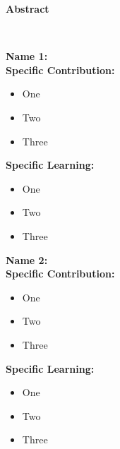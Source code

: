 \documentclass[12pt,a4paper]{report}
\begin{document}
\newpage
\tableofcontents
\newpage
\listoffigures{}
\newpage
\listoftables
\makeatletter
\renewcommand*{\numberline}[1]{\hb@xt@1em{#1\hfil}} 
\makeatother
\newpage
\centerline{\Large\textbf{Abstract}}
\leavevmode\\
\raggedright\textbf{Name 1:}\\ %



\textbf{Specific Contribution:}\\
\vspace{-5mm}
\begin{itemize}
    \item One
    \vspace{-4mm}\item Two
    \vspace{-4mm}\item Three
\end{itemize}
\textbf{Specific Learning:}\\
\vspace{-5mm}
\begin{itemize}
    \item One
    \vspace{-4mm}\item Two
    \vspace{-4mm}\item Three
\end{itemize}
\textbf{Name 2:}\\ %
\justifying
\textbf{Specific Contribution:}\\
\vspace{-5mm}
\begin{itemize}
    \item One
    \vspace{-4mm}\item Two
    \vspace{-4mm}\item Three
\end{itemize}
\textbf{Specific Learning:}\\
\vspace{-5mm}
\begin{itemize}
    \item One
    \vspace{-4mm}\item Two
    \vspace{-4mm}\item Three
\end{itemize}
\newpage

\newpage

\newpage

\newpage

\newpage




\nocite{*}



\newpage

\newpage

\end{document}
